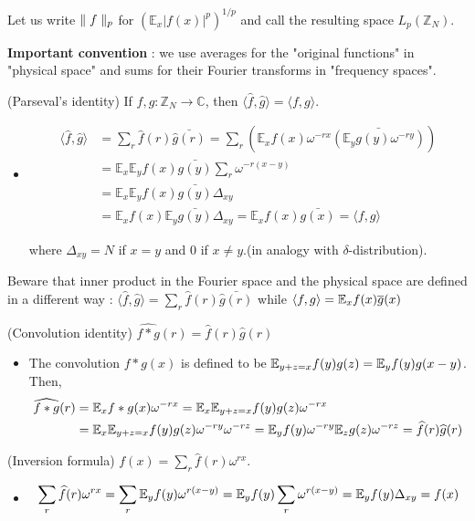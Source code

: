 \documentclass[10pt,a4paper]{report}
\renewcommand{\hat}{\widehat}
\begin{document}
Let us write $\parallel f \parallel_{p}$ for $(\mathbb{E}_x |f(x)|^p)^{1/p}$ and call the resulting space $L_p(\mathbb{Z}_N)$.
\s

\textbf{Important convention} : we use averages for the "original functions" in "physical space" and sums for their Fourier transforms in "frequency spaces".
\s

 (Parseval's identity) If $f,g:\mathbb{Z}_N \rightarrow \mathbb{C}$, then $\langle \hat{f},\hat{g}\rangle =\langle f,g\rangle$.
\begin{itemize}
\item[ ] \pf
\begin{align*}
\langle \hat{f},\hat{g} \rangle &= \sum_{r} \hat{f}(r) \bar{\hat{g}(r)} = \sum_r (\mathbb{E}_x f(x)\omega^{-rx} \bar{(\mathbb{E}_y g(y) \omega^{-ry})} ) \\
&= \mathbb{E}_x \mathbb{E}_y f(x)\bar{g(y)} \sum_r \omega^{-r(x-y)} \\
&= \mathbb{E}_x \mathbb{E}_y f(x)\bar{g(y)} \Delta_{xy}\\
&=  \mathbb{E}_x f(x) \mathbb{E}_y \bar{g(y)} \Delta_{xy} = \mathbb{E}_x f(x)\bar{g(x)} = \langle f,g \rangle
\end{align*}

where $\Delta_{xy} = N$ if $x=y$ and $0$ if $x\neq y$.(in analogy with $\delta$-distribution).

\eop
\end{itemize}
\s

Beware that inner product in the Fourier space and the physical space are defined in a different way : $\langle \hat{f},\hat{g} \rangle = \sum_{r} \hat{f}(r) \bar{\hat{g}(r)}$ while $\langle f,g\rangle = \mathbb{E}_x f(x) \overline{g}(x)$
\s

(Convolution identity) $\hat{f * g}(r) = \hat{f}(r) \hat{g}(r)$

\begin{itemize}
\item[ ]\pf The convolution $f*g(x)$ is defined to be $\mathbb{E}_{y+z =x} f(y) g(z) = \mathbb{E}_y f(y)g(x-y)$. Then,
\begin{align*}
\hat{f * g}(r) &= \avg_x f*g(x) \omega^{-rx} = \avg_x \avg_{y+z =x} f(y) g(z) \omega^{-rx} \\
&= \avg_x \avg_{y+z=x} f(y) g(z) \omega^{-ry}\omega^{-rz} = \avg_y f(y) \omega^{-ry} \avg_{z} g(z) \omega^{-rz} = \hat{f}(r) \hat{g}(r)
\end{align*}
\eop
\end{itemize} 
\s

(Inversion formula)  $f(x) = \sum_{r} \hat{f}(r)\omega^{rx}$.
\begin{itemize}
\item[ ] \pf
\begin{align*}
\sum_{r} \hat{f}(r) \omega^{rx} = \sum_r \avg_y f(y) \omega^{r(x-y)} = \avg_y f(y) \sum_r \omega^{r(x-y)} = \avg_y f(y) \Delta_{xy}  = f(x)
\end{align*}
\eop

\end{itemize}
\s
\end{document}
